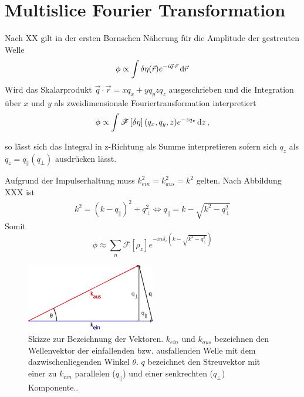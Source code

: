 \section{Multislice Fourier Transformation}
	Nach XX gilt in der ersten Bornschen Näherung für die Amplitude der gestreuten Welle
	\begin{equation}
		\phi\propto\int \delta\eta(\vec{r}) e^{-i\vec{q}\cdot \vec{r}} \dif \vec{r}
	\end{equation}
    Wird das Skalarprodukt $\vec{q}\cdot \vec{r}=xq_x+yq_yzq_z$ ausgeschrieben und die Integration über $x$ und $y$ als zweidimensionale Fouriertransformation interpretiert
	\begin{equation}
	\phi\propto\int \mathscr{F}\left[\delta\eta\right](q_x,q_y,z) e^{-zq_z} \dif z \, ,
	\end{equation}

	so lässt sich das Integral in z-Richtung als Summe interpretieren sofern sich $q_z$ als $q_z=q_\parallel(q_\perp)$ ausdrücken lässt.
	
	Aufgrund der Impulserhaltung muss $k_{ein}^2=k_{aus}^2=k^2$ gelten. Nach Abbildung XXX ist
	\begin{align}
	k^2=(k-q_\parallel)^2+q_{\perp}^2
	\Leftrightarrow q_\parallel=k-\sqrt{k^2-q_\perp^2}
	\end{align}
	Somit
	\begin{equation}
	\phi\approx\sum_n{\mathscr{F}\left[\rho_z\right] e^{-in\delta_z\left(k-\sqrt{k^2-q_\perp^2}\right) }}
	\end{equation}

	\begin{figure}
		\centering
		\includegraphics[width=0.5\textwidth]{images/msft.eps}
		\caption[Abbildungstext im Abbildungsverzeichnis]{Skizze zur Bezeichnung der Vektoren. $k_{ein}$ und $k_{aus}$ bezeichnen den Wellenvektor der einfallenden bzw. ausfallenden Welle mit dem dazwischenliegenden Winkel $\theta$. $q$ bezeichnet den Streuvektor mit einer zu $k_{ein}$ parallelen ($q_{||}$) und einer senkrechten ($q_\perp$) Komponente.. }
		\label{Abb:BspAbbildung}
	\end{figure} 

